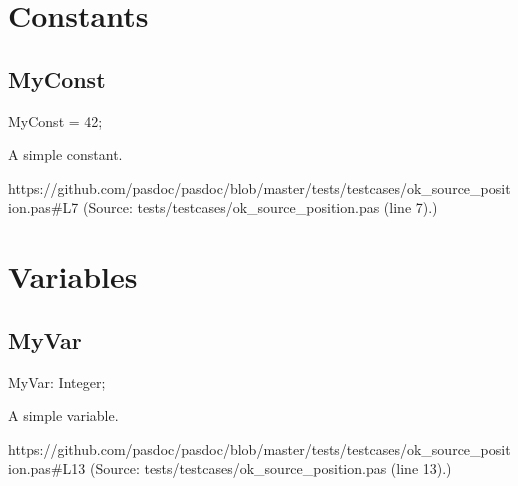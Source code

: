 \documentclass{report}
\begin{document}
\section{Constants}
\subsection*{MyConst}
\begin{list}{}{
\setlength{\itemindent}{0cm}
\setlength{\listparindent}{0cm}
\setlength{\leftmargin}{\evensidemargin}
\addtolength{\leftmargin}{\tmplength}
\settowidth{\labelsep}{X}
\addtolength{\leftmargin}{\labelsep}
\setlength{\labelwidth}{\tmplength}
}
\begin{flushleft}
\item[\textbf{Declaration}\hfill]
\begin{ttfamily}
MyConst = 42;\end{ttfamily}


\end{flushleft}
\par
\item[\textbf{Description}]
A simple constant.\par
https://github.com/pasdoc/pasdoc/blob/master/tests/testcases/ok{\_}source{\_}position.pas{\#}L7 (Source: tests/testcases/ok{\_}source{\_}position.pas (line 7).)

\end{list}
\section{Variables}
\subsection*{MyVar}
\begin{list}{}{
\setlength{\itemindent}{0cm}
\setlength{\listparindent}{0cm}
\setlength{\leftmargin}{\evensidemargin}
\addtolength{\leftmargin}{\tmplength}
\settowidth{\labelsep}{X}
\addtolength{\leftmargin}{\labelsep}
\setlength{\labelwidth}{\tmplength}
}
\begin{flushleft}
\item[\textbf{Declaration}\hfill]
\begin{ttfamily}
MyVar: Integer;\end{ttfamily}


\end{flushleft}
\par
\item[\textbf{Description}]
A simple variable.\par
https://github.com/pasdoc/pasdoc/blob/master/tests/testcases/ok{\_}source{\_}position.pas{\#}L13 (Source: tests/testcases/ok{\_}source{\_}position.pas (line 13).)

\end{list}
\end{document}
